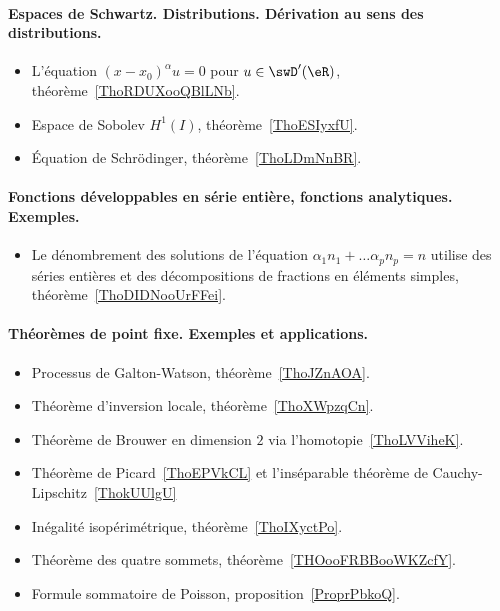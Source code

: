 \paragraph{Espaces de Schwartz. Distributions. Dérivation au sens des distributions.}
\begin{itemize}
    \item L'équation \( (x-x_0)^{\alpha}u=0\) pour \( u\in\swD'(\eR)\), théorème~\ref{ThoRDUXooQBlLNb}.
    \item Espace de Sobolev \( H^1(I)\), théorème~\ref{ThoESIyxfU}.
    \item Équation de Schrödinger, théorème~\ref{ThoLDmNnBR}.
\end{itemize}

\paragraph{Fonctions développables en série entière, fonctions analytiques. Exemples.}
\begin{itemize}
    \item Le dénombrement des solutions de l'équation \( \alpha_1 n_1+\ldots \alpha_pn_p=n\) utilise des séries entières et des décompositions de fractions en éléments simples, théorème~\ref{ThoDIDNooUrFFei}.
\end{itemize}
\paragraph{Théorèmes de point fixe. Exemples et applications.}
\begin{itemize}
    \item Processus de Galton-Watson, théorème~\ref{ThoJZnAOA}.
    \item Théorème d'inversion locale, théorème~\ref{ThoXWpzqCn}.
    \item Théorème de Brouwer en dimension \( 2\) via l'homotopie~\ref{ThoLVViheK}.
    \item Théorème de Picard~\ref{ThoEPVkCL} et l'inséparable théorème de Cauchy-Lipschitz~\ref{ThokUUlgU}
\end{itemize}
\begin{itemize}
    \item Inégalité isopérimétrique, théorème~\ref{ThoIXyctPo}.
    \item Théorème des quatre sommets, théorème~\ref{THOooFRBBooWKZcfY}.
\end{itemize}
\begin{itemize}
    \item Formule sommatoire de Poisson, proposition~\ref{ProprPbkoQ}.
\end{itemize}
